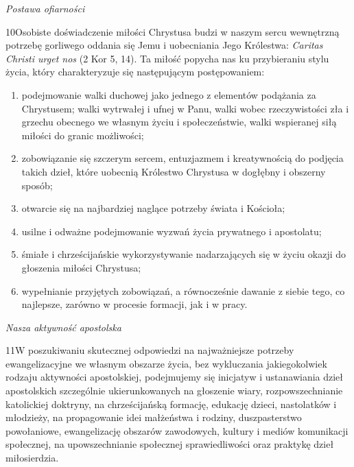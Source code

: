 ﻿\documentclass{book}
\newcommand{\lett}[1]{\lettrine[findent=6pt]{#1}}
\newcommand{\ssec}[1]{\vspace{1em}\textit{#1}\vspace{.5em}\nopagebreak}
\begin{document}
\ssec{Postawa ofiarności}
 
\lett{10} Osobiste doświadczenie miłości Chrystusa budzi w naszym sercu wewnętrzną potrzebę gorliwego oddania się Jemu i uobecniania Jego Królestwa: {\em Caritas Christi urget nos} (2 Kor 5, 14). Ta miłość popycha nas ku przybieraniu stylu życia, który charakteryzuje się następującym postępowaniem:


\begin{enumerate}


\item podejmowanie walki duchowej jako jednego z elementów podążania za Chrystusem; walki wytrwałej i ufnej w Panu, walki wobec rzeczywistości zła i grzechu obecnego we własnym życiu i społeczeństwie, walki wspieranej siłą miłości do granic możliwości;


\item zobowiązanie się szczerym sercem, entuzjazmem i kreatywnością do podjęcia takich dzieł, które uobecnią Królestwo Chrystusa w dogłębny i obszerny sposób;


\item otwarcie się na najbardziej naglące potrzeby świata i Kościoła;


\item usilne i odważne podejmowanie wyzwań życia prywatnego i apostolatu;


\item śmiałe i chrześcijańskie wykorzystywanie nadarzających się w życiu okazji do głoszenia miłości Chrystusa;


\item wypełnianie przyjętych zobowiązań, a równocześnie dawanie z siebie tego, co najlepsze, zarówno w procesie formacji, jak i w pracy.


\end{enumerate}


\ssec{Nasza aktywność apostolska}
 
\lett{11} W poszukiwaniu skutecznej odpowiedzi na najważniejsze potrzeby ewangelizacyjne we własnym obszarze życia, bez wykluczania jakiegokolwiek rodzaju aktywności apostolskiej, podejmujemy się inicjatyw i ustanawiania dzieł apostolskich szczególnie ukierunkowanych na głoszenie wiary, rozpowszechnianie katolickiej doktryny, na chrześcijańską formację, edukację dzieci, nastolatków i młodzieży, na propagowanie idei małżeństwa i rodziny, duszpasterstwo powołaniowe, ewangelizację obszarów zawodowych, kultury i mediów komunikacji społecznej, na upowszechnianie społecznej sprawiedliwości oraz praktykę dzieł miłosierdzia.
 
\end{document}
